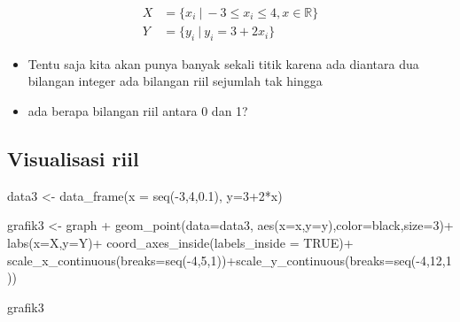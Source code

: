 \documentclass[
  letterpaper,
  DIV=11,
  numbers=noendperiod]{scrartcl}
\newenvironment{Shaded}{\begin{snugshade}}{\end{snugshade}}
\newcommand{\AttributeTok}[1]{\textcolor[rgb]{0.40,0.45,0.13}{#1}}
\newcommand{\ConstantTok}[1]{\textcolor[rgb]{0.56,0.35,0.01}{#1}}
\newcommand{\DecValTok}[1]{\textcolor[rgb]{0.68,0.00,0.00}{#1}}
\newcommand{\FloatTok}[1]{\textcolor[rgb]{0.68,0.00,0.00}{#1}}
\newcommand{\FunctionTok}[1]{\textcolor[rgb]{0.28,0.35,0.67}{#1}}
\newcommand{\NormalTok}[1]{\textcolor[rgb]{0.00,0.23,0.31}{#1}}
\newcommand{\OtherTok}[1]{\textcolor[rgb]{0.00,0.23,0.31}{#1}}
\newcommand{\SpecialCharTok}[1]{\textcolor[rgb]{0.37,0.37,0.37}{#1}}
\newcommand{\StringTok}[1]{\textcolor[rgb]{0.13,0.47,0.30}{#1}}
\begin{document}
\[
\begin{align}
X&=\{x_i \ | \ -3 \leq x_i \leq 4, x \in \mathbb{R}\} \\
Y&=\{y_i \ | \  y_i=3+2x_i\}
\end{align}
\]

\begin{itemize}
\item
  Tentu saja kita akan punya banyak sekali titik karena ada diantara dua
  bilangan integer ada bilangan riil sejumlah tak hingga
\item
  ada berapa bilangan riil antara 0 dan 1?
\end{itemize}

\hypertarget{visualisasi-riil-1}{%
\subsection{Visualisasi riil}\label{visualisasi-riil-1}}

\begin{Shaded}
\begin{Highlighting}[]
\NormalTok{data3 }\OtherTok{\textless{}{-}} \FunctionTok{data\_frame}\NormalTok{(}\AttributeTok{x =} \FunctionTok{seq}\NormalTok{(}\SpecialCharTok{{-}}\DecValTok{3}\NormalTok{,}\DecValTok{4}\NormalTok{,}\FloatTok{0.1}\NormalTok{),}
                    \AttributeTok{y=}\DecValTok{3}\SpecialCharTok{+}\DecValTok{2}\SpecialCharTok{*}\NormalTok{x)}
                          
\NormalTok{grafik3 }\OtherTok{\textless{}{-}}\NormalTok{ graph }\SpecialCharTok{+}
  \FunctionTok{geom\_point}\NormalTok{(}\AttributeTok{data=}\NormalTok{data3,}
             \FunctionTok{aes}\NormalTok{(}\AttributeTok{x=}\NormalTok{x,}\AttributeTok{y=}\NormalTok{y),}\AttributeTok{color=}\StringTok{\textquotesingle{}black\textquotesingle{}}\NormalTok{,}\AttributeTok{size=}\DecValTok{3}\NormalTok{)}\SpecialCharTok{+}
  \FunctionTok{labs}\NormalTok{(}\AttributeTok{x=}\StringTok{\textquotesingle{}X\textquotesingle{}}\NormalTok{,}\AttributeTok{y=}\StringTok{\textquotesingle{}Y\textquotesingle{}}\NormalTok{)}\SpecialCharTok{+}
  \FunctionTok{coord\_axes\_inside}\NormalTok{(}\AttributeTok{labels\_inside =} \ConstantTok{TRUE}\NormalTok{)}\SpecialCharTok{+}
  \FunctionTok{scale\_x\_continuous}\NormalTok{(}\AttributeTok{breaks=}\FunctionTok{seq}\NormalTok{(}\SpecialCharTok{{-}}\DecValTok{4}\NormalTok{,}\DecValTok{5}\NormalTok{,}\DecValTok{1}\NormalTok{))}\SpecialCharTok{+}\FunctionTok{scale\_y\_continuous}\NormalTok{(}\AttributeTok{breaks=}\FunctionTok{seq}\NormalTok{(}\SpecialCharTok{{-}}\DecValTok{4}\NormalTok{,}\DecValTok{12}\NormalTok{,}\DecValTok{1}\NormalTok{))}

\NormalTok{grafik3}
\end{Highlighting}
\end{Shaded}
\end{document}
